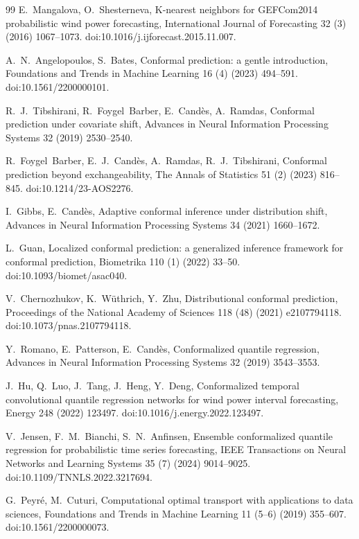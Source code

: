 \documentclass[preprint,3p,times]{elsarticle}
\begin{document}
\begin{thebibliography}{99}
E.~Mangalova, O.~Shesterneva,
K-nearest neighbors for GEFCom2014 probabilistic wind power forecasting,
International Journal of Forecasting 32 (3) (2016) 1067--1073.
doi:10.1016/j.ijforecast.2015.11.007.

A.~N.~Angelopoulos, S.~Bates,
Conformal prediction: a gentle introduction,
Foundations and Trends in Machine Learning 16 (4) (2023) 494--591.
doi:10.1561/2200000101.

R.~J.~Tibshirani, R.~Foygel~Barber, E.~Cand\`es, A.~Ramdas,
Conformal prediction under covariate shift,
Advances in Neural Information Processing Systems 32 (2019) 2530--2540.

R.~Foygel~Barber, E.~J.~Cand\`es, A.~Ramdas, R.~J.~Tibshirani,
Conformal prediction beyond exchangeability,
The Annals of Statistics 51 (2) (2023) 816--845.
doi:10.1214/23-AOS2276.

I.~Gibbs, E.~Cand\`es,
Adaptive conformal inference under distribution shift,
Advances in Neural Information Processing Systems 34 (2021) 1660--1672.

L.~Guan,
Localized conformal prediction: a generalized inference framework for conformal prediction,
Biometrika 110 (1) (2022) 33--50.
doi:10.1093/biomet/asac040.

V.~Chernozhukov, K.~W\"uthrich, Y.~Zhu,
Distributional conformal prediction,
Proceedings of the National Academy of Sciences 118 (48) (2021) e2107794118.
doi:10.1073/pnas.2107794118.

Y.~Romano, E.~Patterson, E.~Cand\`es,
Conformalized quantile regression,
Advances in Neural Information Processing Systems 32 (2019) 3543--3553.

J.~Hu, Q.~Luo, J.~Tang, J.~Heng, Y.~Deng,
Conformalized temporal convolutional quantile regression networks for wind power interval forecasting,
Energy 248 (2022) 123497.
doi:10.1016/j.energy.2022.123497.

V.~Jensen, F.~M.~Bianchi, S.~N.~Anfinsen,
Ensemble conformalized quantile regression for probabilistic time series forecasting,
IEEE Transactions on Neural Networks and Learning Systems 35 (7) (2024) 9014--9025.
doi:10.1109/TNNLS.2022.3217694.

G.~Peyr\'e, M.~Cuturi,
Computational optimal transport with applications to data sciences,
Foundations and Trends in Machine Learning 11 (5--6) (2019) 355--607.
doi:10.1561/2200000073.


\end{thebibliography}
\end{document}
